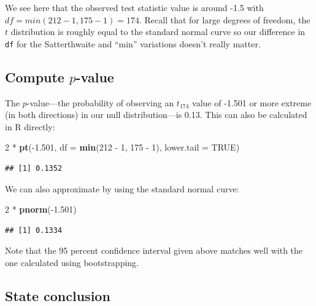 \documentclass[]{tufte-book}
\newenvironment{Shaded}{\begin{snugshade}}{\end{snugshade}}
\newcommand{\KeywordTok}[1]{\textcolor[rgb]{0.13,0.29,0.53}{\textbf{{#1}}}}
\newcommand{\DataTypeTok}[1]{\textcolor[rgb]{0.13,0.29,0.53}{{#1}}}
\newcommand{\DecValTok}[1]{\textcolor[rgb]{0.00,0.00,0.81}{{#1}}}
\newcommand{\FloatTok}[1]{\textcolor[rgb]{0.00,0.00,0.81}{{#1}}}
\newcommand{\StringTok}[1]{\textcolor[rgb]{0.31,0.60,0.02}{{#1}}}
\newcommand{\OtherTok}[1]{\textcolor[rgb]{0.56,0.35,0.01}{{#1}}}
\newcommand{\NormalTok}[1]{{#1}}
\begin{document}
We see here that the observed test statistic value is around -1.5 with
\(df = min(212 - 1, 175 - 1) = 174\). Recall that for large degrees of
freedom, the \(t\) distribution is roughly equal to the standard normal
curve so our difference in \texttt{df} for the Satterthwaite and ``min''
variations doesn't really matter.

\subsection{\texorpdfstring{Compute
\(p\)-value}{Compute p-value}}\label{compute-p-value-2}

The \(p\)-value---the probability of observing an \(t_{174}\) value of
-1.501 or more extreme (in both directions) in our null
distribution---is 0.13. This can also be calculated in R directly:

\begin{Shaded}
\begin{Highlighting}[]
\DecValTok{2} \NormalTok{*}\StringTok{ }\KeywordTok{pt}\NormalTok{(-}\FloatTok{1.501}\NormalTok{, }\DataTypeTok{df =} \KeywordTok{min}\NormalTok{(}\DecValTok{212} \NormalTok{-}\StringTok{ }\DecValTok{1}\NormalTok{, }\DecValTok{175} \NormalTok{-}\StringTok{ }\DecValTok{1}\NormalTok{), }\DataTypeTok{lower.tail =} \OtherTok{TRUE}\NormalTok{)}
\end{Highlighting}
\end{Shaded}

\begin{verbatim}
## [1] 0.1352
\end{verbatim}

We can also approximate by using the standard normal curve:

\begin{Shaded}
\begin{Highlighting}[]
\DecValTok{2} \NormalTok{*}\StringTok{ }\KeywordTok{pnorm}\NormalTok{(-}\FloatTok{1.501}\NormalTok{)}
\end{Highlighting}
\end{Shaded}

\begin{verbatim}
## [1] 0.1334
\end{verbatim}

Note that the 95 percent confidence interval given above matches well
with the one calculated using bootstrapping.

\subsection{State conclusion}\label{state-conclusion-3}
\end{document}
